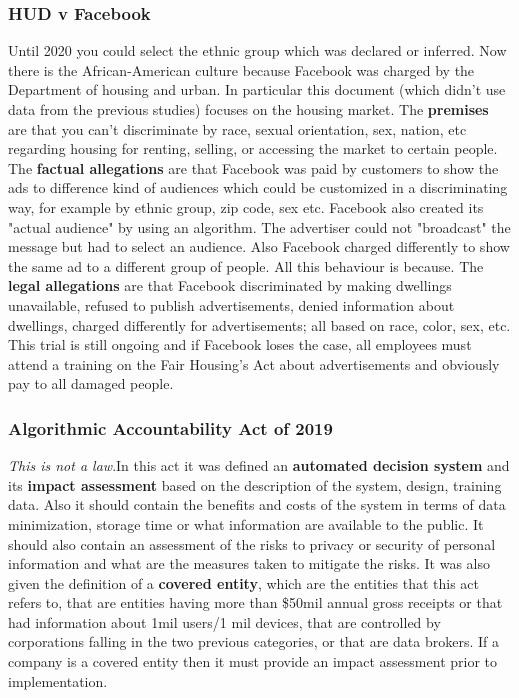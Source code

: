 \subsubsection{HUD v Facebook}
Until 2020 you could select the ethnic group which was declared or inferred. Now there is the African-American culture because Facebook was charged by the Department of housing and urban. In particular this document (which didn't use data from the previous studies) focuses on the housing market. The \textbf{premises} are that you can't discriminate by race, sexual orientation, sex, nation, etc regarding housing for renting, selling, or accessing the market to certain people. The \textbf{factual allegations} are that Facebook was paid by customers to show the ads to difference kind of audiences which could be customized in a discriminating way, for example by ethnic group, zip code, sex etc. Facebook also created its "actual audience" by using an algorithm. The advertiser could not "broadcast" the message but had to select an audience. Also Facebook charged differently to show the same ad to a different group of people. All this behaviour is because. The \textbf{legal allegations} are that Facebook discriminated by making dwellings unavailable, refused to publish advertisements, denied information about dwellings, charged differently for advertisements; all based on race, color, sex, etc. This trial is still ongoing and if Facebook loses the case, all employees must attend a training on the Fair Housing's Act about advertisements and obviously pay to all damaged people.
\subsubsection{Algorithmic Accountability Act of 2019}
\textit{This is not a law}.In this act it was defined an \textbf{automated decision system} and its \textbf{impact assessment} based on the description of the system, design, training data. Also it should contain the benefits and costs of the system in terms of data minimization, storage time or what information are available to the public. It should also contain an assessment of the risks to privacy or security of personal information and what are the measures taken to mitigate the risks. It was also given the definition of a \textbf{covered entity}, which are the entities that this act refers to, that are entities having more than \$50mil annual gross receipts or that had information about 1mil users/1 mil devices, that are controlled by corporations falling in the two previous categories, or that are data brokers. If a company is a covered entity then it must provide an impact assessment prior to implementation.
